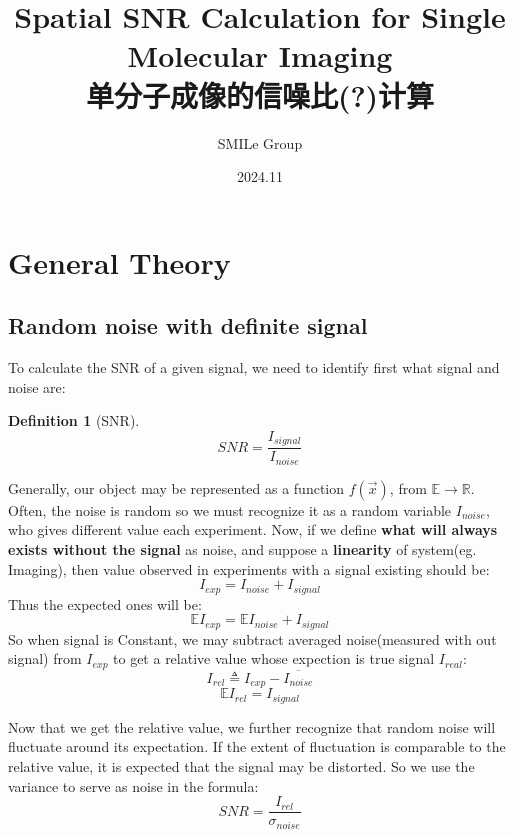 \documentclass[12pt]{ctexart}%
\title{Spatial SNR Calculation for Single Molecular Imaging\\单分子成像的信噪比(?)计算}
\author{SMILe Group}
\date{2024.11}
\newtheorem{definition}{Definition}
\begin{document}


\maketitle  %
\section{General Theory}
\subsection*{Random noise with definite signal}
To calculate the SNR of a given signal, we need to identify first what signal and noise are:
\begin{definition}[SNR]
    \begin{equation}
        SNR=\frac{I_{signal}}{I_{noise}}
    \end{equation}
\end{definition}
\par Generally, our object may be represented as a function $f(\vec{x})$, from $\mathbb{E}\to\mathbb{R}$. Often, the noise is random so we must recognize it as a random variable $I_{noise}$, who gives different value each experiment. Now, if we define \textbf{what will always exists without the signal} as noise, and suppose a \textbf{linearity} of system(eg. Imaging), then value observed in experiments with a signal existing should be:
\begin{equation}
    I_{exp}=I_{noise}+I_{signal}
\end{equation}
Thus the expected ones will be:
\begin{equation}
    \mathbb{E}I_{exp}=\mathbb{E}I_{noise}+I_{signal}
\end{equation}
So when signal is Constant, we may subtract averaged noise(measured with out signal) from $I_{exp}$ to get a relative value whose expection is true signal $I_{real}$:
\begin{equation}
    I_{rel}\triangleq I_{exp}-\overline {I_{noise}}
\end{equation}
\begin{equation}
    \mathbb{E}I_{rel}= I_{signal}
\end{equation}
\par Now that we get the relative value, we further recognize that random noise will fluctuate around its expectation. If the extent of fluctuation is comparable to the relative value, it is expected that the signal may be distorted. So we use the variance to serve as noise in the formula:
\begin{equation}
    SNR=\frac{I_{rel}}{\sigma_{noise}}
\end{equation}
\end{document}
